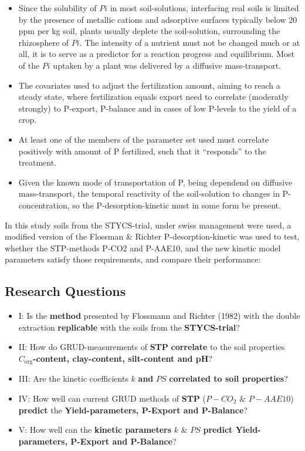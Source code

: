 \documentclass[
  letterpaper,
  DIV=11,
  numbers=noendperiod]{scrartcl}
\providecommand{\tightlist}{%
  \setlength{\itemsep}{0pt}\setlength{\parskip}{0pt}}\usepackage{longtable,booktabs,array}
\begin{document}
\begin{itemize}
\tightlist
\item
  Since the solubility of \(Pi\) in most soil-solutions, interfacing
  real soils is limited by the presence of metallic cations and
  adsorptive surfaces typically below 20 ppm per kg soil, plants usually
  deplete the soil-solution, surrounding the rhizosphere of \(Pi\). The
  intensity of a nutrient must not be changed much or at all, it is to
  serve as a predictor for a reaction progress and equilibrium. Most of
  the \(Pi\) uptaken by a plant was delivered by a diffusive
  mass-transport.
\item
  The covariates used to adjust the fertilization amount, aiming to
  reach a steady state, where fertilization equals export need to
  correlate (moderatly strongly) to P-export, P-balance and in cases of
  low P-levels to the yield of a crop.
\item
  At least one of the members of the parameter set used must correlate
  positively with amount of P fertilized, such that it ``responds'' to
  the treatment.
\item
  Given the known mode of transportation of P, being dependend on
  diffusive mass-transport, the temporal reactivity of the soil-solution
  to changes in P-concentration, so the P-desorption-kinetic must in
  some form be present.
\end{itemize}

In this study soils from the STYCS-trial, under swiss management were
used, a modified version of the Flossman \& Richter P-desorption-kinetic
was used to test, whether the STP-methods P-CO2 and P-AAE10, and the new
kinetic model parameters satisfy those requirements, and compare their
performance:

\subsection{Research Questions}\label{research-questions}

\begin{itemize}
\tightlist
\item
  I: Is the \textbf{method} presented by Flossmann and Richter (1982)
  with the double extraction \textbf{replicable} with the soils from the
  \textbf{STYCS-trial}?
\item
  II: How do GRUD-measurements of \textbf{STP} \textbf{correlate} to the
  soil properties \(C_\text{org}\)\textbf{-content, clay-content,
  silt-content and pH}?
\item
  III: Are the kinetic coefficients \(k\) \textbf{and} \(PS\)
  \textbf{correlated to soil properties}?
\item
  IV: How well can current GRUD methods of \textbf{STP} (\(P-CO_2\) \&
  \(P-AAE10\)) \textbf{predict} the \textbf{Yield-parameters, P-Export
  and P-Balance}?
\item
  V: How well can the \textbf{kinetic parameters} \(k\) \& \(PS\)
  \textbf{predict Yield-parameters, P-Export and P-Balance}?
\end{itemize}
\end{document}
